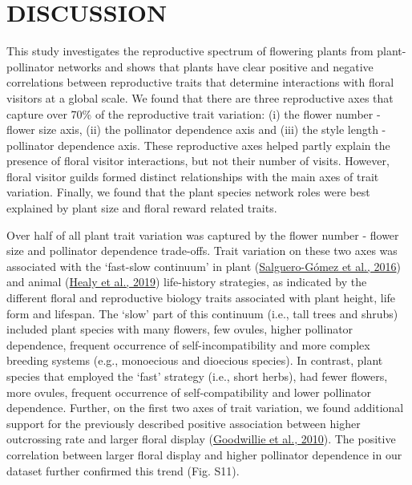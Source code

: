 \documentclass[
  12pt,
  a4paper,
]{article}
\begin{document}
\hypertarget{discussion}{%
\section{DISCUSSION}\label{discussion}}

This study investigates the reproductive spectrum of flowering plants from plant-pollinator networks and shows that plants have clear positive and negative correlations between reproductive traits that determine interactions with floral visitors at a global scale. We found that there are three reproductive axes that capture over 70\% of the reproductive trait variation: (i) the flower number - flower size axis, (ii) the pollinator dependence axis and (iii) the style length - pollinator dependence axis. These reproductive axes helped partly explain the presence of floral visitor interactions, but not their number of visits. However, floral visitor guilds formed distinct relationships with the main axes of trait variation. Finally, we found that the plant species network roles were best explained by plant size and floral reward related traits.

Over half of all plant trait variation was captured by the flower number - flower size and pollinator dependence trade-offs. Trait variation on these two axes was associated with the `fast-slow continuum' in plant (\protect\hyperlink{ref-salguero2016}{Salguero-Gómez et al., 2016}) and animal (\protect\hyperlink{ref-healy2019}{Healy et al., 2019}) life-history strategies, as indicated by the different floral and reproductive biology traits associated with plant height, life form and lifespan. The `slow' part of this continuum (i.e., tall trees and shrubs) included plant species with many flowers, few ovules, higher pollinator dependence, frequent occurrence of self-incompatibility and more complex breeding systems (e.g., monoecious and dioecious species). In contrast, plant species that employed the `fast' strategy (i.e., short herbs), had fewer flowers, more ovules, frequent occurrence of self-compatibility and lower pollinator dependence. Further, on the first two axes of trait variation, we found additional support for the previously described positive association between higher outcrossing rate and larger floral display (\protect\hyperlink{ref-goodwillie2010}{Goodwillie et al., 2010}). The positive correlation between larger floral display and higher pollinator dependence in our dataset further confirmed this trend (Fig. S11).
\end{document}
